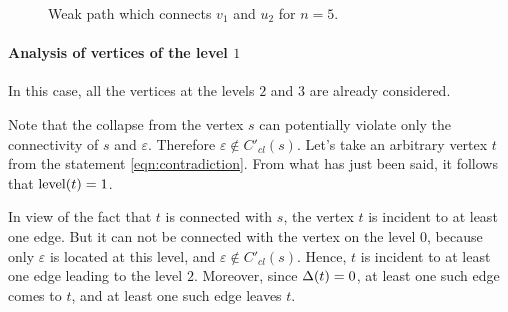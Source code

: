 \begin{figure}[ht]
\begin{center}

\end{center}

\caption{Weak path which connects $v_1$ and $u_2$ for $n=5$.}\label{fig:lvl2n5pathvu}
\end{figure}

\paragraph{Analysis of vertices of the level \texorpdfstring{$1$}{1}}

In this case, all the vertices at the levels $ 2 $ and $ 3 $ are already considered.

Note that the collapse from the vertex $ s $ can potentially violate only the connectivity of $ s $ and $ \varepsilon $. Therefore $ \varepsilon \notin C'_{cl} (s) $. Let's take an arbitrary vertex $ t $ from the statement \ref{eqn:contradiction}. From what has just been said, it follows that $ \operatorname{level} (t) = 1 $.

In view of the fact that $ t $ is connected with $ s $, the vertex $ t $ is incident to at least one edge. But it can not be connected with the vertex on the level $ 0 $, because only $ \varepsilon $ is located at this level, and $ \varepsilon \notin C'_{cl} (s) $. Hence, $ t $ is incident to at least one edge leading to the level $ 2 $. Moreover, since $ \operatorname{\Delta} (t) = 0 $, at least one such edge comes to $ t $, and at least one such edge leaves $ t $.


